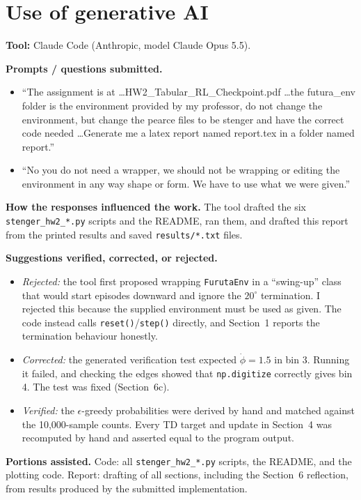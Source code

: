 \documentclass[11pt]{article}
\begin{document}
\appendix
\section{Use of generative AI}

\textbf{Tool:} Claude Code (Anthropic, model Claude Opus 5.5).

\textbf{Prompts / questions submitted.}
\begin{itemize}\itemsep0pt
\item ``The assignment is at \ldots HW2\_Tabular\_RL\_Checkpoint.pdf \ldots the futura\_env folder is the
environment provided by my professor, do not change the environment, but change the pearce files to be
stenger and have the correct code needed \ldots Generate me a latex report named report.tex in a folder
named report.''
\item ``No you do not need a wrapper, we should not be wrapping or editing the environment in any way
shape or form. We have to use what we were given.''
\end{itemize}

\textbf{How the responses influenced the work.} The tool drafted the six
\texttt{stenger\_hw2\_*.py} scripts and the README, ran them, and drafted this
report from the printed results and saved \texttt{results/*.txt} files.

\textbf{Suggestions verified, corrected, or rejected.}
\begin{itemize}\itemsep0pt
\item \emph{Rejected:} the tool first proposed wrapping \texttt{FurutaEnv} in a
``swing-up'' class that would start episodes downward and ignore the
$20^\circ$ termination. I rejected this because the supplied environment must be
used as given. The code instead calls \texttt{reset()}/\texttt{step()} directly,
and Section~1 reports the termination behaviour honestly.
\item \emph{Corrected:} the generated verification test expected
$\dot\phi=1.5$ in bin 3. Running it failed, and checking the edges showed that
\texttt{np.digitize} correctly gives bin 4. The test was fixed (Section~6c).
\item \emph{Verified:} the $\epsilon$-greedy probabilities were derived by hand
and matched against the 10{,}000-sample counts. Every TD target and update in
Section~4 was recomputed by hand and asserted equal to the program output.
\end{itemize}

\textbf{Portions assisted.} Code: all \texttt{stenger\_hw2\_*.py} scripts, the
README, and the plotting code. Report: drafting of all sections, including the
Section~6 reflection, from results produced by the submitted implementation.
\end{document}
